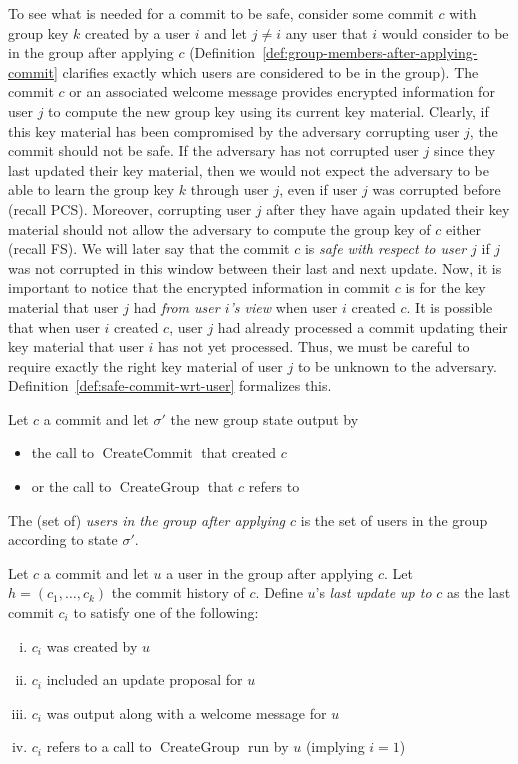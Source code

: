 To see what is needed for a commit to be safe, consider some commit $c$ with group key $k$ created by a user $i$ and let $j \neq i$ any user that $i$ would consider to be in the group after applying $c$ (Definition~\ref{def:group-members-after-applying-commit} clarifies exactly which users are considered to be in the group). The commit $c$ or an associated welcome message provides encrypted information for user $j$ to compute the new group key using its current key material. Clearly, if this key material has been compromised by the adversary corrupting user $j$, the commit should not be safe. If the adversary has not corrupted user $j$ since they last updated their key material, then we would not expect the adversary to be able to learn the group key $k$ through user $j$, even if user $j$ was corrupted before (recall PCS).
Moreover, corrupting user $j$ after they have again updated their key material should not allow the adversary to compute the group key of $c$ either (recall FS). We will later say that the commit $c$ is \emph{safe with respect to user $j$} if $j$ was not corrupted in this window between their last and next update.
Now, it is important to notice that the encrypted information in commit $c$ is for the key material that user $j$ had \emph{from user $i$'s view} when user $i$ created $c$. It is possible that when user $i$ created $c$, user $j$ had already processed a commit updating their key material that user $i$ has not yet processed. Thus, we must be careful to require exactly the right key material of user $j$ to be unknown to the adversary. Definition~\ref{def:safe-commit-wrt-user} formalizes this.

\begin{definition} \label{def:group-members-after-applying-commit}
	Let $c$ a commit and let $\sigma'$ the new group state output by
	\begin{itemize}
		\item the call to $\operatorname{CreateCommit}$ that created $c$
		\item or the call to $\operatorname{CreateGroup}$ that $c$ refers to
	\end{itemize}
	The (set of) \emph{users in the group after applying $c$} is the set of users in the group according to state $\sigma'$.
\end{definition}


\begin{definition} \label{def:last-update-before-commit}
	Let $c$ a commit and let $u$ a user in the group after applying $c$. Let $h = (c_1, \ldots, c_k)$ the commit history of $c$. Define $u$'s \emph{last update up to} $c$ as the last commit $c_i$ to satisfy one of the following:
	\begin{enumerate}[(i)]
		\item $c_i$ was created by $u$
		\item $c_i$ included an update proposal for $u$
		\item $c_i$ was output along with a welcome message for $u$
		\item $c_i$ refers to a call to $\operatorname{CreateGroup}$ run by $u$ (implying $i = 1$)
	\end{enumerate}
\end{definition}

